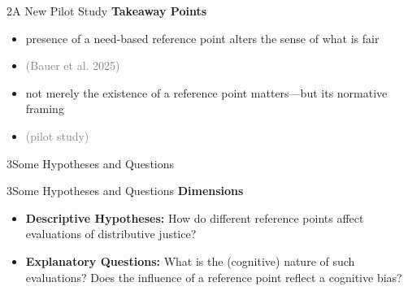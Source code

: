 \documentclass[xcolor=table,9pt,aspectratio=169]{beamer}
\begin{document}
\begin{frame}{\vspace*{10mm}2\hspace*{1em}A New Pilot Study}
   \textbf{Takeaway Points}
   
   \medskip
   \begin{itemize}
      \item presence of a need-based reference point alters the sense of what is fair
      \item[] \textcolor{gray}{(Bauer et al. 2025)}
      \item not merely the existence of a reference point matters---but its normative framing
      \item[] \textcolor{gray}{(pilot study)}
   \end{itemize}
\end{frame}


\begin{frame}
   \begin{overlayarea}{\textwidth}{0.81\paperheight}{
      \vspace*{11mm}
      \textcolor{uolblue}
      {3\hspace*{1em}Some Hypotheses and Questions}
   }
   \end{overlayarea}
\end{frame}


\begin{frame}{\vspace*{10mm}3\hspace*{1em}Some Hypotheses and Questions}
   \textbf{Dimensions}
   
   \medskip
   \begin{itemize}
      \item \textbf{Descriptive Hypotheses:} How do different reference points affect evaluations of distributive justice?
      \item \textbf{Explanatory Questions:} What is the (cognitive) nature of such evaluations? Does the influence of a reference point reflect a cognitive bias?
   \end{itemize}
\end{frame}
\end{document}
